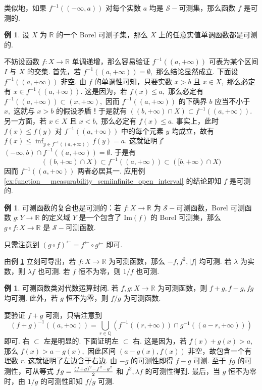 \documentclass[12pt, a4paper, oneside]{book}
\numberwithin{figure}{section}
\theoremstyle{definition}
\newtheorem{example}[theorem]{例}
\begin{document}
类似地，如果 $f^{-1}((-\infty,a))$ 对每个实数 $a$ 均是 $\mathcal S-$可测集，那么函数 $f$ 是可测的.

\begin{example}\label{ex:monotone_function_is_measurable}
    设 $X$ 为 $\mathbb R$ 的一个 Borel 可测子集，那么 $X$ 上的任意实值单调函数都是可测的.
\end{example}
不妨设函数 $f:X\to\mathbb R$ 单调递增，那么容易验证 $f^{-1}((a,+\infty))$ 可表为某个区间 $I$ 与 $X$ 的交集. 首先，若 $f^{-1}((a,+\infty))=\emptyset,$ 那么结论显然成立. 下面设 $f^{-1}((a,+\infty))$ 非空. 
由 $f$ 的单调性可知，只要实数 $x>b$ 且 $x\in X,$ 那么必定有 $x\in f^{-1}((a,+\infty)).$ 这是因为，若 $f(x)\leq a,$ 那么必定有 $f^{-1}((a,+\infty))\subset (x,+\infty),$ 因而 
$f^{-1}((a,+\infty))$ 的下确界 $b$ 应当不小于 $x,$ 这就与 $x>b$ 的假设矛盾！于是就有 $((b,+\infty)\cap X)\subset f^{-1}((a,+\infty)).$ 
另一方面，若 $x\in X$ 且 $x<b,$ 那么必定有 $f(x)\leq a.$ 事实上，此时 $f(x)\leq f(y)$ 对 $f^{-1}((a,+\infty))$ 中的每个元素 $y$ 均成立，故有 $f(x)\leq \inf_{y\in f^{-1}((a,+\infty))}f(y)=a.$ 这就证明了 $(-\infty,b)\cap f^{-1}((a,+\infty))=\emptyset.$ 于是有
\begin{equation}
    ((b,+\infty)\cap X)\subset f^{-1}((a,+\infty))\subset ([b,+\infty)\cap X)
\end{equation}
因而 $f^{-1}((a,+\infty))$ 两者必居其一. 应用例 \ref{ex:function__measurability_semiinfinite_open_interval} 的结论即知 $f$ 是可测的.

\begin{example}\label{ex:composition_of_measurable_functions}
    可测函数的复合也是可测的：若 $f:X\to\mathbb R$ 为 $\mathcal S-$可测函数，Borel 可测函数 $g:Y\to\mathbb R$ 的定义域 $Y$ 是一个包含了 $\mathrm{Im}(f)$ 的 Borel 可测集，那么 $g\circ f:X\to\mathbb R$ 是 $\mathcal S-$可测函数.
\end{example}
只需注意到 $(g\circ f)^\leftarrow=f^\leftarrow\circ g^\leftarrow$ 即可.

由例 \ref{ex:composition_of_measurable_functions} 立刻可导出，若 $f:X\to\mathbb R$ 为可测函数，那么 $-f,f^2,|f|$ 均可测. 若 $\lambda$ 为实数，则 $\lambda f$ 也可测. 若 $f$ 恒不为零，则 $1/f$ 也可测.


\begin{example}
    可测函数类对代数运算封闭. 若 $f,g:X\to\mathbb R$ 为可测函数，则 $f+g,f-g,fg$ 均可测. 此外，若 $g$ 恒不为零，则 $f/g$ 为可测函数.
\end{example}
要验证 $f+g$ 可测，只需注意到 
\begin{equation}
    (f+g)^{-1}((a,+\infty))=\bigcup_{r\in\mathbb Q}\left(f^{-1}((r,+\infty))\cap g^{-1}((a-r,+\infty))\right)
\end{equation}
即可. 右 $\subset$ 左是明显的. 下面证明左 $\subset$ 右.
这是因为，若 $f(x)+g(x)>a,$ 那么 $f(x)>a-g(x),$ 因此区间 $(a-g(x),f(x))$ 非空，故包含一个有理数 $r.$ 这就证明了左边含于右边.
由 $-g$ 的可测性即得 $f-g$ 可测. 至于 $fg$ 的可测性，可从等式 $fg = {(f+g)^2-f^2-g^2\over 2}$ 和 $f^2,\lambda f$ 的可测性得到. 
最后，当 $g$ 恒不为零时，由 $1/g$ 的可测性即知 $f/g$ 可测.
\end{document}

